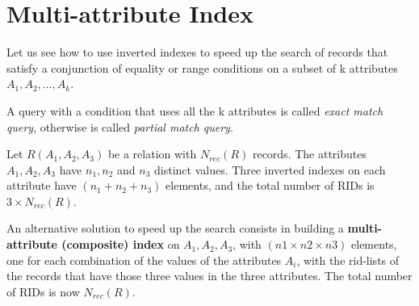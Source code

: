 \section{Multi-attribute Index}
Let us see how to use inverted indexes to speed up the search of records that satisfy a conjunction of equality or range conditions on a subset of k attributes \(A_1, A_2,..., A_k\).

A query with a condition that uses all the k attributes is called \textit{exact match query}, otherwise is called \textit{partial match query}.

Let \(R(A_1, A_2, A_3)\) be a relation with \(N_{rec}(R)\) records. The attributes \(A_1, A_2, A_3\) have \(n_1, n_2\) and \(n_3\) distinct values. Three inverted indexes on each attribute have \((n_1+n_2+n_3)\) elements, and the total number of RIDs is \(3 \times N_{rec}(R)\).

An alternative solution to speed up the search consists in building a \textbf{multi-attribute (composite) index} on \(A_1, A_2, A_3\), with \((n1 \times n2 \times n3)\) elements, one for each combination of the values of the attributes \(A_i\), with the rid-lists of the records that have those three values in the three attributes. The total number of RIDs is now \(N_{rec}(R)\).